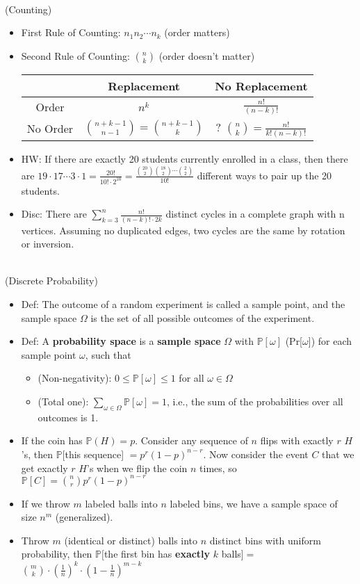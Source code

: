 \documentclass{article}
\begin{document}
 \\
(Counting)
\begin{itemize}
	\item First Rule of Counting: $n_1n_2\cdots n_k$ (order matters)
	\item Second Rule of Counting: $\binom{n}{k}$ (order doesn't matter)
\begin{center}
	\begin{tabular}{ |c|c|c| } 
 	\hline
 	 & Replacement & No Replacement \\
 	\hline
 	Order & $n^k$ & $\frac{n!}{(n-k)!}$ \\
 	\hline
 	No Order & $\binom{n+k-1}{n-1} = \binom{n+k-1}{k}$ & ? $\binom{n}{k} = \frac{n!}{k!(n-k)!}$ \\ 
 	\hline
	\end{tabular}
\end{center}
	\item HW: If there are exactly 20 students currently enrolled in a class, then there are $19\cdot17\cdots3\cdot1 = \frac{20!}{10!\cdot2^{10}} = \frac{\binom{20}{2}\binom{18}{2}\cdots\binom{2}{2}} {10!}$ different ways to pair up the 20 students.
	\item Disc: There are $\sum\limits_{k=3}^n \frac{n!}{(n-k)!\cdot2k}$ distinct cycles in a complete graph with n vertices. Assuming no duplicated edges, two cycles are the same by rotation or inversion.
\end{itemize}

 \\
(Discrete Probability)
\begin{itemize}
	\item Def: The outcome of a random experiment is called a sample point, and the sample space $\Omega$ is the set of all possible outcomes of the experiment.
	\item Def: A \textbf{probability space} is a \textbf{sample space} $\Omega$ with $\mathbb{P}[\omega]$ (Pr[$\omega$]) for each sample point $\omega$, such that
	\begin{itemize}
		\item (Non-negativity): $0\leq\mathbb{P}[\omega]\leq1$ for all $\omega\in\Omega$
		\item (Total one): $\sum\limits_{\omega\in\Omega} \mathbb{P}[\omega] = 1$, i.e., the sum of the probabilities over all outcomes is 1.
	\end{itemize}
	\item If the coin has $\mathbb{P}(H) = p$. Consider any sequence of $n$ flips with exactly $r$ $H$'s, then $\mathbb{P}$[this sequence] $= p^r (1-p)^{n-r}$. Now consider the event $C$ that we get exactly $r$ $H$’s when we flip the coin $n$ times, so $\mathbb{P}[C] = \binom{n}{r} p^r (1-p)^{n-r}$
	\item If we throw $m$ labeled balls into $n$ labeled bins, we have a sample space of size $n^m$ (generalized).
	\item Throw $m$ (identical or distinct) balls into $n$ distinct bins with uniform probability, then $\mathbb{P}[$the first bin has \textbf{exactly} $k$ balls$]=$ $\binom{m}{k}\cdot(\frac{1}{n})^k\cdot (1-\frac{1}{n})^{m-k}$
\end{itemize}
\end{document}
